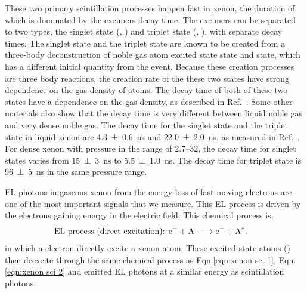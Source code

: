 These two primary scintillation processes happen fast in xenon, the duration of which is dominated by the excimers decay time. The excimers can be separated to two types, the singlet state (, ) and triplet state (, ), with separate decay times. The singlet state and the triplet state are known to be created from a three-body deconstruction of noble gas atom excited state  state and  state, which has a different initial quantity from the event. Because these creation processes are three body reactions, the creation rate of the these two states have strong dependence on the gas density of atoms. The decay time of both of these two states have a dependence on the gas density, as described in  Ref.~\cite{Keto1974}. Some other materials also show that the decay time is very different between liquid noble gas and very dense noble gas. The decay time for the singlet state and the triplet state in liquid xenon are \SI[separate-uncertainty=false]{4.3 \pm 0.6}{\ns}  and \SI[separate-uncertainty=false]{22.0 \pm 2.0}{\ns}, as measured in Ref.~\cite{Hitachi1983}. For dense xenon with pressure in the range of \SIrange{2.7}{32}{\atm}, the decay time for singlet states varies from \SI[separate-uncertainty=false]{15 \pm 3}{\ns} to \SI[separate-uncertainty=false]{5.5 \pm 1.0}{\ns}. The decay time for triplet state is \SI[separate-uncertainty=false]{96 \pm 5}{\ns} in the same pressure range.


EL photons in gaseous xenon from the energy-loss of fast-moving electrons are one of the most important signals that we measure. This EL process is driven by the electrons gaining energy in the electric field. This chemical process is,
\begin{align}
\text{EL process (direct excitation): } &\ce{e^- + A -> e^- + A^*} .
\end{align}
in which a electron directly excite a xenon atom. These excited-state atoms () then deexcite through the same chemical process as Eqn.\ref{eqn:xenon sci 1}, Eqn.\ref{eqn:xenon sci 2} and emitted EL photons at a similar energy as scintillation photons. 

